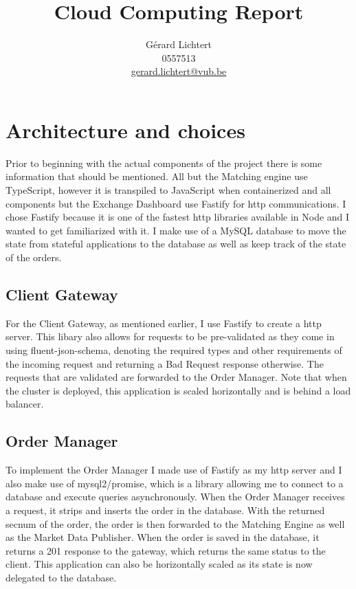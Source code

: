 \documentclass{article}
\title{Cloud Computing Report}
\author{Gérard Lichtert \\
0557513\\
\href{mailto:gerard.lichtert@vub.be}{gerard.lichtert@vub.be}
}
\begin{document}
\maketitle
\tableofcontents
\newpage
\raggedright
\section{Architecture and choices}
Prior to beginning with the actual components of the project there is some information that should be mentioned.
All but the Matching engine use TypeScript, however it is transpiled to JavaScript when containerized and all components but the Exchange Dashboard use Fastify for http communications.
I chose Fastify because it is one of the fastest http libraries available in Node and I wanted to get familiarized with it.
I make use of a MySQL database to move the state from stateful applications to the database as well as keep track of the state of the orders.
\subsection{Client Gateway}
For the Client Gateway, as mentioned earlier, I use Fastify to create a http server.
This libary also allows for requests to be pre-validated as they come in using fluent-json-schema, denoting the required types and other requirements of the incoming request and returning a Bad Request response otherwise.
The requests that are validated are forwarded to the Order Manager.
Note that when the cluster is deployed, this application is scaled horizontally and is behind a load balancer.
\subsection{Order Manager}
To implement the Order Manager I made use of Fastify as my http server and I also make use of mysql2/promise, which is a library allowing me to connect to a database and execute queries asynchronously. When the Order Manager receives a request, it strips and inserts the order in the database. With the returned secnum of the order, the order is then forwarded to the Matching Engine as well as the Market Data Publisher. When the order is saved in the database, it returns a 201 response to the gateway, which returns the same status to the client.
This application can also be horizontally scaled as its state is now delegated to the database.
\end{document}
